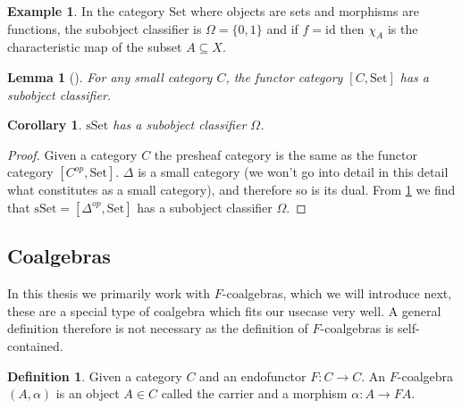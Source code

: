 \documentclass[12pt]{article}
\newtheorem{lemma}[theorem]{Lemma}
\newtheorem{corollary}[theorem]{Corollary}
\theoremstyle{definition}
\newtheorem{definition}[theorem]{Definition}
\newtheorem{example}[theorem]{Example}
\newcommand{\1}{\mathbbm{1}}
\newcommand{\id}{\text{id}}
\begin{document}
\begin{example}
    In the category $\mathrm{Set}$ where objects are sets and morphisms are functions, the subobject classifier is $\Omega = \{0,1\}$ and if $f = \id$ then $\chi_A$ is the characteristic map of the subset $A\subseteq X$.
\end{example}

\begin{lemma}[{\cite[Lemma.~1.6.5]{Elephant}}]\label{lem:exist-sub_class}
    For any small category $C$, the functor category $[C, \mathrm{Set}]$ has a subobject classifier.
\end{lemma}

\begin{corollary}
    $\mathrm{sSet}$ has a subobject classifier $\Omega$.
\end{corollary}

\begin{proof}
    Given a category $C$ the presheaf category is the same as the functor category $[C^{op}, \mathrm{Set}]$. $\Delta$ is a small category (we won't go into detail in this detail what constitutes as a small category), and therefore so is its dual. From \ref{lem:exist-sub_class} we find that $\mathrm{sSet} = [\Delta^{op}, \mathrm{Set}]$ has a subobject classifier $\Omega$.
\end{proof}

\subsection{Coalgebras}
In this thesis we primarily work with $F$-coalgebras, which we will introduce next, these are a special type of coalgebra which fits our usecase very well. A general definition therefore is not necessary as the definition of $F$-coalgebras is self-contained.

\begin{definition}
    Given a category $C$ and an endofunctor $F: C \to C$. An $F$-coalgebra $(A,\alpha)$ is an object $A\in C$ called the carrier and a morphism $\alpha: A\to FA$.
\end{definition}
\end{document}
